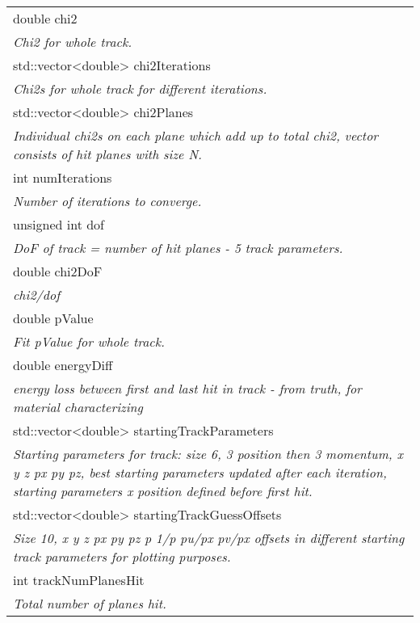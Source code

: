\begin{longtable}{|p{16cm}|}
double chi2 \\ 
\textit{Chi2 for whole track.} \\ \hline

std::vector\textless{}double\textgreater{} chi2Iterations \\
\textit{Chi2s for whole track for different iterations.} \\ \hline

std::vector\textless{}double\textgreater{} chi2Planes \\
\textit{Individual chi2s on each plane which add up to total chi2, vector consists of hit planes with size N.} \\ \hline

int numIterations \\
\textit{Number of iterations to converge.} \\ \hline

unsigned int dof \\
\textit{DoF of track = number of hit planes - 5 track parameters.} \\ \hline

double chi2DoF \\
\textit{chi2/dof} \\ \hline

double pValue \\
\textit{Fit pValue for whole track.} \\ \hline

double energyDiff \\
\textit{energy loss between first and last hit in track - from truth, for material characterizing} \\ \hline

std::vector\textless{}double\textgreater{} startingTrackParameters \\
\textit{Starting parameters for track: size 6, 3 position then 3 momentum, x y z px py pz, best starting parameters updated after each iteration, starting parameters x position defined before first hit.} \\ \hline

std::vector\textless{}double\textgreater{} startingTrackGuessOffsets \\
\textit{Size 10, x y z px py pz p 1/p pu/px pv/px offsets in different starting track parameters for plotting purposes.} \\ \hline

int trackNumPlanesHit \\ 
\textit{Total number of planes hit.} \\ \hline


\end{longtable}

